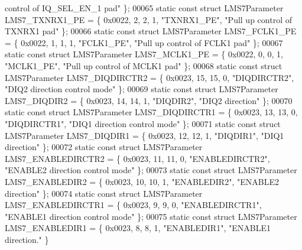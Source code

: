 \begin{DoxyCode}
{       control of IQ\_SEL\_EN\_1 pad"} \};
00065 \textcolor{keyword}{static} \textcolor{keyword}{const} \textcolor{keyword}{struct }LMS7Parameter LMS7_TXNRX1_PE = \{ 0x0022, 2, 2, 1, \textcolor{stringliteral}{"TXNRX1\_PE"}, \textcolor{stringliteral}{"Pull up control of
       TXNRX1 pad"} \};
00066 \textcolor{keyword}{static} \textcolor{keyword}{const} \textcolor{keyword}{struct }LMS7Parameter LMS7_FCLK1_PE = \{ 0x0022, 1, 1, 1, \textcolor{stringliteral}{"FCLK1\_PE"}, \textcolor{stringliteral}{"Pull up control of FCLK1
       pad"} \};
00067 \textcolor{keyword}{static} \textcolor{keyword}{const} \textcolor{keyword}{struct }LMS7Parameter LMS7_MCLK1_PE = \{ 0x0022, 0, 0, 1, \textcolor{stringliteral}{"MCLK1\_PE"}, \textcolor{stringliteral}{"Pull up control of MCLK1
       pad"} \};
00068 \textcolor{keyword}{static} \textcolor{keyword}{const} \textcolor{keyword}{struct }LMS7Parameter LMS7_DIQDIRCTR2 = \{ 0x0023, 15, 15, 0, \textcolor{stringliteral}{"DIQDIRCTR2"}, \textcolor{stringliteral}{"DIQ2 direction
       control mode"} \};
00069 \textcolor{keyword}{static} \textcolor{keyword}{const} \textcolor{keyword}{struct }LMS7Parameter LMS7_DIQDIR2 = \{ 0x0023, 14, 14, 1, \textcolor{stringliteral}{"DIQDIR2"}, \textcolor{stringliteral}{"DIQ2 direction"} \};
00070 \textcolor{keyword}{static} \textcolor{keyword}{const} \textcolor{keyword}{struct }LMS7Parameter LMS7_DIQDIRCTR1 = \{ 0x0023, 13, 13, 0, \textcolor{stringliteral}{"DIQDIRCTR1"}, \textcolor{stringliteral}{"DIQ1 direction
       control mode"} \};
00071 \textcolor{keyword}{static} \textcolor{keyword}{const} \textcolor{keyword}{struct }LMS7Parameter LMS7_DIQDIR1 = \{ 0x0023, 12, 12, 1, \textcolor{stringliteral}{"DIQDIR1"}, \textcolor{stringliteral}{"DIQ1 direction"} \};
00072 \textcolor{keyword}{static} \textcolor{keyword}{const} \textcolor{keyword}{struct }LMS7Parameter LMS7_ENABLEDIRCTR2 = \{ 0x0023, 11, 11, 0, \textcolor{stringliteral}{"ENABLEDIRCTR2"}, \textcolor{stringliteral}{"ENABLE2
       direction control mode"} \};
00073 \textcolor{keyword}{static} \textcolor{keyword}{const} \textcolor{keyword}{struct }LMS7Parameter LMS7_ENABLEDIR2 = \{ 0x0023, 10, 10, 1, \textcolor{stringliteral}{"ENABLEDIR2"}, \textcolor{stringliteral}{"ENABLE2 direction"} 
      \};
00074 \textcolor{keyword}{static} \textcolor{keyword}{const} \textcolor{keyword}{struct }LMS7Parameter LMS7_ENABLEDIRCTR1 = \{ 0x0023, 9, 9, 0, \textcolor{stringliteral}{"ENABLEDIRCTR1"}, \textcolor{stringliteral}{"ENABLE1
       direction control mode"} \};
00075 \textcolor{keyword}{static} \textcolor{keyword}{const} \textcolor{keyword}{struct }LMS7Parameter LMS7_ENABLEDIR1 = \{ 0x0023, 8, 8, 1, \textcolor{stringliteral}{"ENABLEDIR1"}, \textcolor{stringliteral}{"ENABLE1 direction."} \}

\end{DoxyCode}
